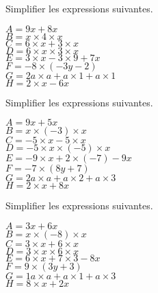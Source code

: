 \documentclass[a4paper,11pt,fleqn]{article}		%
\begin{document}
\begin{multicols}{2}
Simplifier les expressions suivantes.

\begin{multicols}{2}
$A=9 x +8 x$\\
$B=x\times 4 \times x$\\
$C=6\times x +3\times x$\\
$D=6\times x\times 3\times x$\\
$E=3 \times x-3\times 9 +7 x$\\
$F=-8 \times (-3y -2)$\\
$G=2 a\times  a+a\times 1+a\times 1$\\
$H= 2\times x -6x$
\end{multicols}

Simplifier les expressions suivantes.

\begin{multicols}{2}
$A=9 x +5 x$\\
$B=x\times (-3) \times x$\\
$C=-5\times x -5\times x$\\
$D=-5\times x\times (-5)\times x$\\
$E=-9 \times x+2\times (-7) -9 x$\\
$F=-7 \times (8y +7)$\\
$G=2 a\times  a+a\times 2+a\times 3$\\
$H= 2\times x +8x$
\end{multicols}

Simplifier les expressions suivantes.

\begin{multicols}{2}
$A=3 x +6 x$\\
$B=x\times (-8) \times x$\\
$C=3\times x +6\times x$\\
$D=3\times x\times 6\times x$\\
$E=6 \times x+7\times 3 -8 x$\\
$F=9 \times (3y +3)$\\
$G=1 a\times  a+a\times 1+a\times 3$\\
$H= 8\times x +2x$
\end{multicols}
%
%
%



\end{multicols}
\end{document}
